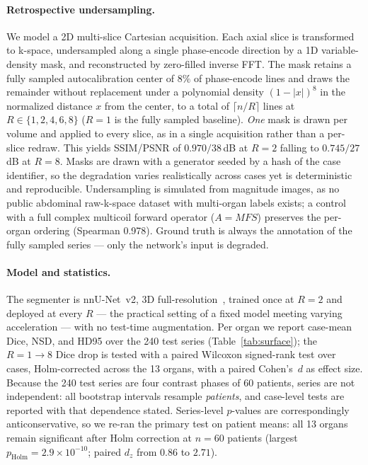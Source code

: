 \documentclass[10pt,twocolumn,letterpaper]{article}
\begin{document}
\paragraph{Retrospective undersampling.}
We model a 2D multi-slice Cartesian acquisition. Each axial slice is transformed to k-space, undersampled along a single phase-encode direction by a 1D variable-density mask, and reconstructed by zero-filled inverse FFT. The mask retains a fully sampled autocalibration center of $8\%$ of phase-encode lines and draws the remainder without replacement under a polynomial density $(1-|x|)^{8}$ in the normalized distance $x$ from the center, to a total of $\lceil n/R \rceil$ lines at $R\in\{1,2,4,6,8\}$ ($R{=}1$ is the fully sampled baseline). \emph{One} mask is drawn per volume and applied to every slice, as in a single acquisition rather than a per-slice redraw. This yields SSIM/PSNR of $0.970/38$\,dB at $R{=}2$ falling to $0.745/27$\,dB at $R{=}8$. Masks are drawn with a generator seeded by a hash of the case identifier, so the degradation varies realistically across cases yet is deterministic and reproducible. Undersampling is simulated from magnitude images, as no public abdominal raw-k-space dataset with multi-organ labels exists; a control with a full complex multicoil forward operator ($A = M F S$) preserves the per-organ ordering (Spearman 0.978). Ground truth is always the annotation of the fully sampled series --- only the network's input is degraded.

\paragraph{Model and statistics.}
The segmenter is nnU-Net~v2, 3D full-resolution~\cite{isensee2021}, trained once at $R{=}2$ and deployed at every $R$ --- the practical setting of a fixed model meeting varying acceleration --- with no test-time augmentation. Per organ we report case-mean Dice, NSD, and HD95 over the 240 test series (Table~\ref{tab:surface}); the $R{=}1{\to}8$ Dice drop is tested with a paired Wilcoxon signed-rank test over cases, Holm-corrected across the 13 organs, with a paired Cohen's~$d$ as effect size. Because the 240 test series are four contrast phases of 60 patients, series are not independent: all bootstrap intervals resample \emph{patients}, and case-level tests are reported with that dependence stated. Series-level $p$-values are correspondingly anticonservative, so we re-ran the primary test on patient means: all 13 organs remain significant after Holm correction at $n{=}60$ patients (largest $p_{\text{Holm}}{=}2.9\times10^{-10}$; paired $d_z$ from $0.86$ to $2.71$).
\end{document}
